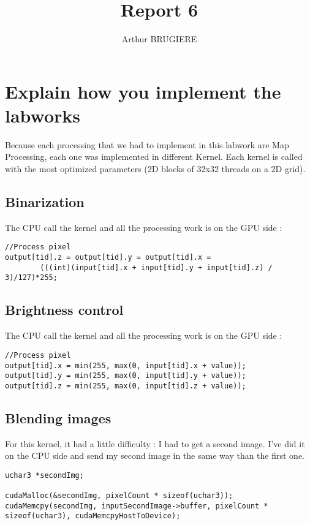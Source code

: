 \documentclass[11pt]{article} %
\title{Report 6}
\author{Arthur BRUGIERE}
\begin{document}
\maketitle

\section{Explain how you implement the labworks}

Because each processing that we had to implement in this labwork are Map Processing, each one was implemented in different Kernel. Each kernel is called with the most optimized parameters (2D blocks of 32x32 threads on a 2D grid). 

\subsection{Binarization}

The CPU call the kernel and all the processing work is on the GPU side :

\begin{lstlisting}[style=CStyle]
//Process pixel
output[tid].z = output[tid].y = output[tid].x = 
		(((int)(input[tid].x + input[tid].y + input[tid].z) / 3)/127)*255;
\end{lstlisting}

\subsection{Brightness control}

The CPU call the kernel and all the processing work is on the GPU side :

\begin{lstlisting}[style=CStyle]
//Process pixel
output[tid].x = min(255, max(0, input[tid].x + value));
output[tid].y = min(255, max(0, input[tid].y + value));
output[tid].z = min(255, max(0, input[tid].z + value));  
\end{lstlisting}

\subsection{Blending images}

For this kernel, it had a little difficulty : I had to get a second image. I've did it on the CPU side and send my second image in the same way than the first one.

\begin{lstlisting}[style=CStyle]
uchar3 *secondImg;

cudaMalloc(&secondImg, pixelCount * sizeof(uchar3));
cudaMemcpy(secondImg, inputSecondImage->buffer, pixelCount * sizeof(uchar3), cudaMemcpyHostToDevice);
\end{lstlisting}
\end{document}
